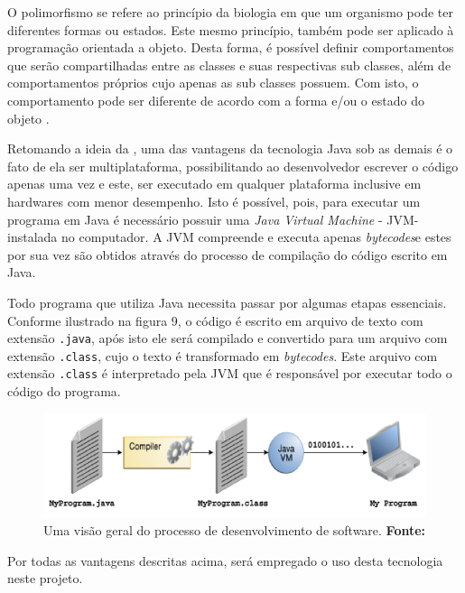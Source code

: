 O polimorfismo se refere ao princípio da biologia em que um organismo pode ter diferentes formas ou estados. Este mesmo princípio, também pode ser aplicado à programação orientada a objeto. Desta forma, é possível definir comportamentos que serão compartilhadas entre as classes e suas respectivas sub classes, além de comportamentos próprios cujo apenas as sub classes possuem. Com isto, o comportamento pode ser diferente de acordo com a forma e/ou o estado do objeto \cite{polymorphism_oracle}.

\par Retomando a ideia da , uma das vantagens da tecnologia Java sob as demais é o fato de ela ser multiplataforma, possibilitando ao desenvolvedor escrever o código apenas uma vez e este, ser executado em qualquer plataforma inclusive em hardwares com menor desempenho. Isto é possível, pois, para executar um programa em Java é necessário possuir uma \textit{Java Virtual Machine} - JVM\footnotemark[12] - instalada no computador. A JVM compreende e executa apenas \textit{bytecodes}\footnotemark[13] e estes por sua vez são obtidos através do processo de compilação do código escrito em Java.



\par Todo programa que utiliza Java necessita passar por algumas etapas essenciais. Conforme ilustrado na figura 9, o código é escrito em arquivo de texto com extensão \texttt{.java}, após isto ele será compilado e convertido para um arquivo com extensão \texttt{.class}, cujo o texto é transformado em \textit{bytecodes}. Este arquivo com extensão \texttt{.class} é interpretado pela JVM que é responsável por executar todo o código do programa.

\newpage
\begin{figure}[h!]
	\centerline{\includegraphics[scale=1]{./imagens/processo_compilacao_java.png}}
	\caption[Uma visão geral do processo de desenvolvimento de software.]
	{Uma visão geral do processo de desenvolvimento de software. \textbf{Fonte:} }
	\label{fig:exemplo1}
\end{figure}

\par Por todas as vantagens descritas acima, será empregado o uso desta tecnologia neste projeto.
